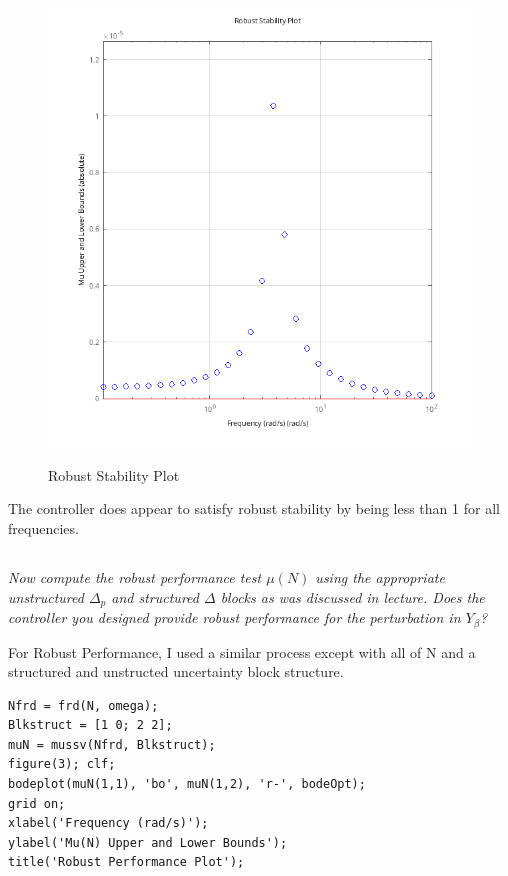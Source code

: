 \documentclass{article}
\begin{document}
\begin{figure}[H]
    \centering
    \includegraphics[width=\textwidth]{3rs.png}
    \label{fig:3rs}
    \caption{Robust Stability Plot}
\end{figure}

The controller does appear to satisfy robust stability by being less than 1 for all frequencies.

\subsection{}

\textit{Now compute the robust performance test $\mu(N)$ using the appropriate unstructured $\Delta_p$ and structured $\Delta$ blocks as was discussed in lecture. Does the controller you designed provide robust performance for the perturbation in $Y_\beta$?}

For Robust Performance, I used a similar process except with all of N and a structured and unstructed uncertainty block structure.

\begin{lstlisting}[style=matlabstyle]
Nfrd = frd(N, omega);
Blkstruct = [1 0; 2 2];
muN = mussv(Nfrd, Blkstruct);
figure(3); clf;
bodeplot(muN(1,1), 'bo', muN(1,2), 'r-', bodeOpt);
grid on;
xlabel('Frequency (rad/s)');
ylabel('Mu(N) Upper and Lower Bounds');
title('Robust Performance Plot');    
\end{lstlisting}
\end{document}
